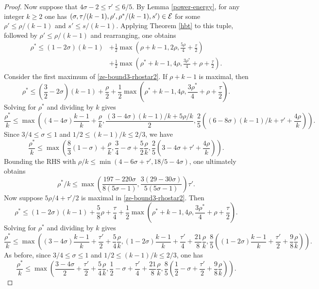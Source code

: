 \begin{proof}
Now suppose that $4\sigma - 2 \le \tau' \le 6/5$. By Lemma \ref{power-energy}, for any integer $k \ge 2$ one has $(\sigma, \tau/(k - 1), \rho', \rho^*/(k - 1), s') \in \mathcal{E}$ for some $\rho' \le \rho/(k - 1)$ and $s' \le s/(k - 1)$. Applying Theorem \ref{hbt} to this tuple, followed by $\rho' \le \rho/(k - 1)$ and rearranging, one obtains 
\begin{equation}\label{ze-bound3-rhostar2}
\begin{split}
\rho^* \le (1-2\sigma)(k - 1) &+ \frac{1}{2}\max(\rho+k - 1, 2\rho, \frac{5\rho}{4} + \frac{\tau}{2}) \\
&+ \frac{1}{2}\max(\rho^*+k - 1, 4\rho, \frac{3\rho^*}{4} + \rho+\frac{\tau}{2}).
\end{split}
\end{equation}
Consider the first maximum of \eqref{ze-bound3-rhostar2}. If $\rho + k - 1$ is maximal, then 
\[
\rho^* \le (\frac{3}{2} - 2\sigma)(k - 1) + \frac{\rho}{2} + \frac{1}{2}\max(\rho^*+k - 1, 4\rho, \frac{3\rho^*}{4} + \rho+\frac{\tau}{2}).
\]
Solving for $\rho^*$ and dividing by $k$ gives 
\[
\frac{\rho^*}{k} \le \max((4 - 4\sigma)\frac{k - 1}{k} + \frac{\rho}{k}, \frac{(3 - 4\sigma)(k - 1)/k + 5\rho/k}{2}, \frac{2}{5}((6 - 8\sigma)(k - 1)/k + \tau' + \frac{4\rho}{k})).
\]
Since $3/4 \le \sigma \le 1$ and $1/2 \le (k - 1)/k \le 2/3$, we have 
\[
\frac{\rho^*}{k} \le \max\left(\frac{8}{3}(1 - \sigma) + \frac{\rho}{k}, \frac{3}{4} - \sigma + \frac{5}{2}\frac{\rho}{k}, \frac{2}{5}(3 - 4\sigma + \tau' + \frac{4\rho}{k})\right).
\]
Bounding the RHS with $\rho/k \le \min(4 - 6\sigma + \tau', 18/5 - 4\sigma)$, one ultimately obtains 
\[
\rho^*/k \le \max\left(\frac{197 - 220\sigma}{8(5\sigma - 1)}, \frac{3(29 - 30\sigma)}{5(5\sigma - 1)}\right)\tau'.
\]
Now suppose $5\rho/4 + \tau'/2$ is maximal in \eqref{ze-bound3-rhostar2}. Then 
\[
\rho^* \le (1 - 2\sigma)(k - 1) + \frac{5}{8}\rho + \frac{\tau}{4} + \frac{1}{2}\max(\rho^*+k - 1, 4\rho, \frac{3\rho^*}{4} + \rho+\frac{\tau}{2}).
\]
Solving for $\rho^*$ and dividing by $k$ gives 
\[
\frac{\rho^*}{k} \le \max((3 - 4\sigma)\frac{k - 1}{k} + \frac{\tau'}{2} + \frac{5}{4}\frac{\rho}{k}, (1 - 2\sigma)\frac{k - 1}{k} + \frac{\tau'}{4} + \frac{21}{8}\frac{\rho}{k}, \frac{8}{5}((1 - 2\sigma)\frac{k - 1}{k} + \frac{\tau'}{2} + \frac{9}{8}\frac{\rho}{k})).
\]
As before, since $3/4 \le \sigma \le 1$ and $1/2 \le (k - 1)/k \le 2/3$, one has 
\[
\frac{\rho^*}{k} \le \max(\frac{3 - 4\sigma}{2} + \frac{\tau'}{2} + \frac{5}{4}\frac{\rho}{k}, \frac{1}{2} - \sigma + \frac{\tau'}{4} + \frac{21}{8}\frac{\rho}{k}, \frac{8}{5}(\frac{1}{2} - \sigma + \frac{\tau'}{2} + \frac{9}{8}\frac{\rho}{k})).
\]
\end{proof}
